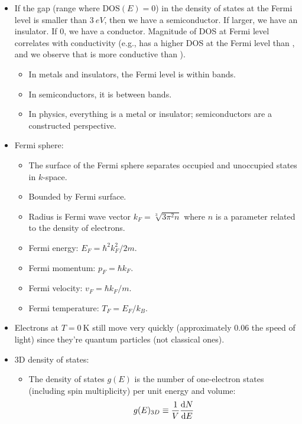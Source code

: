 \documentclass[../notes.tex]{subfiles}
\begin{document}
\begin{itemize}
    \item If the gap (range where $\text{DOS}(E)=0$) in the density of states at the Fermi level is smaller than $\SI{3}{eV}$, then we have a semiconductor. If larger, we have an insulator. If 0, we have a conductor. Magnitude of DOS at Fermi level correlates with conductivity (e.g.,  has a higher DOS at the Fermi level than , and we observe that  is more conductive than ).
    \begin{itemize}
        \item In metals and insulators, the Fermi level is within bands.
        \item In semiconductors, it is between bands.
        \item In physics, everything is a metal or insulator; semiconductors are a constructed perspective.
    \end{itemize}
    \item Fermi sphere:
    \begin{itemize}
        \item The surface of the Fermi sphere separates occupied and unoccupied states in $k$-space.
        \item Bounded by Fermi surface.
        \item Radius is Fermi wave vector $k_F=\sqrt[3]{3\pi^2n}$ where $n$ is a parameter related to the density of electrons.
        \item Fermi energy: $E_F=\hbar^2k_F^2/2m$.
        \item Fermi momentum: $p_F=\hbar k_F$.
        \item Fermi velocity: $v_F=\hbar k_F/m$.
        \item Fermi temperature: $T_F=E_F/k_B$.
    \end{itemize}
    \item Electrons at $T=\SI{0}{\kelvin}$ still move very quickly (approximately $0.06$ the speed of light) since they're quantum particles (not classical ones).
    \item 3D density of states:
    \begin{itemize}
        \item The density of states $g(E)$ is the number of one-electron states (including spin multiplicity) per unit energy and volume:
        \begin{equation*}
            g(E)_{3D} \equiv \frac{1}{V}\dv{N}{E}
        \end{equation*}
        \begin{itemize}

\end{itemize}
\end{itemize}
\end{itemize}
\end{document}
